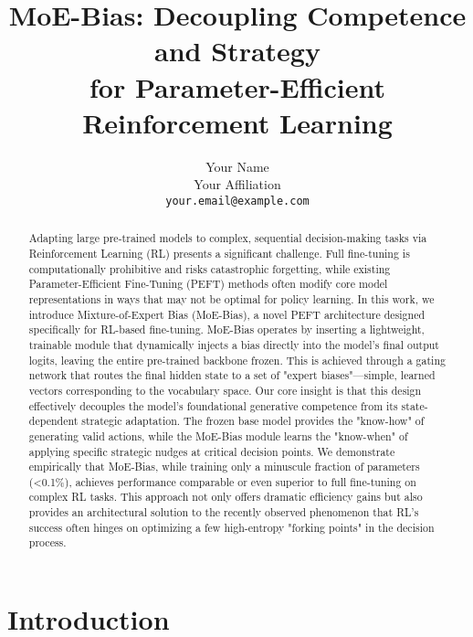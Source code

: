 \documentclass[a4paper]{article}
\title{\textbf{MoE-Bias: Decoupling Competence and Strategy \\ for Parameter-Efficient Reinforcement Learning}}
\author{
  Your Name \\
  Your Affiliation \\
  \texttt{your.email@example.com}
}
\date{}
\begin{document}
\maketitle

\begin{abstract}
Adapting large pre-trained models to complex, sequential decision-making tasks via Reinforcement Learning (RL) presents a significant challenge. Full fine-tuning is computationally prohibitive and risks catastrophic forgetting, while existing Parameter-Efficient Fine-Tuning (PEFT) methods often modify core model representations in ways that may not be optimal for policy learning. In this work, we introduce Mixture-of-Expert Bias (MoE-Bias), a novel PEFT architecture designed specifically for RL-based fine-tuning. MoE-Bias operates by inserting a lightweight, trainable module that dynamically injects a bias directly into the model's final output logits, leaving the entire pre-trained backbone frozen. This is achieved through a gating network that routes the final hidden state to a set of "expert biases"—simple, learned vectors corresponding to the vocabulary space. Our core insight is that this design effectively decouples the model's foundational generative competence from its state-dependent strategic adaptation. The frozen base model provides the "know-how" of generating valid actions, while the MoE-Bias module learns the "know-when" of applying specific strategic nudges at critical decision points. We demonstrate empirically that MoE-Bias, while training only a minuscule fraction of parameters (<0.1\%), achieves performance comparable or even superior to full fine-tuning on complex RL tasks. This approach not only offers dramatic efficiency gains but also provides an architectural solution to the recently observed phenomenon that RL's success often hinges on optimizing a few high-entropy "forking points" in the decision process.
\end{abstract}


\section{Introduction}
\end{document}
